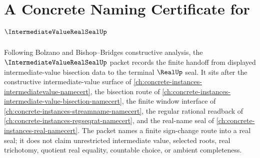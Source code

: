 \chapter{A Concrete Naming Certificate for $\IntermediateValueRealSealUp$}
\label{ch:concrete-instances-intermediate-value-real-seal-namecert}

Following Bolzano and Bishop--Bridges constructive analysis, the $\IntermediateValueRealSealUp$ packet records the finite handoff from displayed intermediate-value bisection data to the terminal $\RealUp$ seal. It sits after the constructive intermediate-value surface of \autoref{ch:concrete-instances-intermediatevalue-namecert}, the bisection route of \autoref{ch:concrete-instances-intermediate-value-bisection-namecert}, the finite window interface of \autoref{ch:concrete-instances-streamname-namecert}, the regular rational readback of \autoref{ch:concrete-instances-regseqrat-namecert}, and the real-name seal of \autoref{ch:concrete-instances-real-namecert}. The packet names a finite sign-change route into a real seal; it does not claim unrestricted intermediate value, selected roots, real trichotomy, quotient real equality, countable choice, or ambient completeness.

